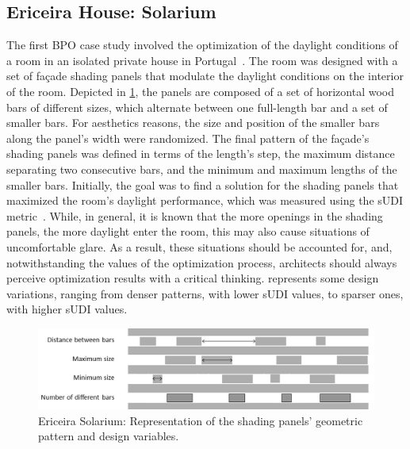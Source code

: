 \subsection{Ericeira House: Solarium}
The first \ac{BPO} case study involved the optimization of the daylight conditions of a room in an isolated private house in Portugal~\cite{Caetano2018,Belem2018optimizeddesign}. The room was designed with a set of façade shading panels that modulate the daylight conditions on the interior of the room. Depicted in \cref{fig:ericeira_panels_explanation}, the panels are composed of a set of horizontal wood bars of different sizes, which alternate between one full-length bar and a set of smaller bars. For aesthetics reasons, the size and position of the smaller bars along the panel's width were randomized. The final pattern of the façade's shading panels was defined in terms of the length’s step, the maximum distance separating two consecutive bars, and the minimum and maximum lengths of the smaller bars. Initially, the goal was to find a solution for the shading panels that maximized the room's daylight performance, which was measured using the \ac{sUDI} metric~\cite{Nabil2006}. While, in general, it is known that the more openings in the shading panels, the more daylight enter the room, this may also cause situations of uncomfortable glare. As a result, these situations should be accounted for, and, notwithstanding the values of the optimization process, architects should always perceive optimization results with a critical thinking.  represents some design variations, ranging from denser patterns, with lower \ac{sUDI} values, to sparser ones, with higher \ac{sUDI} values.

\begin{figure}[htbp]
	\centering
	\includegraphics[width=\textwidth]{Images/Evaluation/Ericeira_1.jpg}
	\caption{Ericeira Solarium: Representation of the shading panels' geometric pattern and design variables.}
	\label{fig:ericeira_panels_explanation}
\end{figure}

